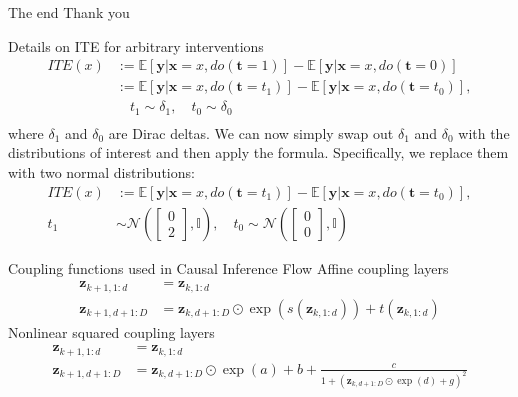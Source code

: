 \documentclass[dvipsnames, aspectratio=169]{beamer}
\newcommand{\E}{\mathbb{E}}
\newcommand{\eye}{\mathbb{I}}
\newcommand{\Norm}{\mathcal{N}}
\newcommand{\bt}{\mathbf{t}}
\newcommand{\bx}{\mathbf{x}}
\newcommand{\by}{\mathbf{y}}
\newcommand{\bz}{\mathbf{z}}
\begin{document}
	
	\begin{frame}{The end}
	    Thank you
	\end{frame}
	
	\begin{frame}{Details on ITE for arbitrary interventions}
	\begin{equation}
        \begin{split}
        ITE(x) &:= \E[\by | \bx=x, do(\bt=1)] - \E[\by | \bx=x, do(\bt=0)]\\
        &:= \E[\by | \bx=x, do(\bt=t_1)] - \E[\by | \bx=x, do(\bt=t_0)],\\
        &\quad t_1 \sim \delta_1, \quad t_0 \sim \delta_0\\
        \end{split}
    \end{equation}
    where $\delta_1$ and $\delta_0$ are Dirac deltas. We can now simply swap out $\delta_1$ and $\delta_0$ with the distributions of interest and then apply the formula. Specifically, we replace them with two normal distributions:
    \begin{equation}
        \begin{split}
        ITE(x) &:= \E[\by | \bx=x, do(\bt=t_1)] - \E[\by | \bx=x, do(\bt=t_0)], \\
        t_1 &\sim \Norm\left(\begin{bmatrix}0 \\ 2\end{bmatrix}, \eye\right), \quad t_0 \sim \Norm\left(\begin{bmatrix}0 \\ 0\end{bmatrix}, \eye\right)
        \end{split}
    \end{equation}
\end{frame}

    \begin{frame}{Coupling functions used in Causal Inference Flow}
        Affine coupling layers
        \begin{align}\label{equation:real_nvp_coupling}
            \bz_{k+1, 1:d} &= \bz_{k, 1:d} \\
            \bz_{k+1, d+1:D} &= \bz_{k, d+1:D} \odot \exp \left(s(\bz_{k, 1:d}) \right) + t(\bz_{k, 1:d})
        \end{align}
        Nonlinear squared coupling layers
        \begin{align}\label{equation:nonlinear_squared_flow}
            \bz_{k+1, 1:d} &= \bz_{k, 1:d} \\
            \bz_{k+1, d+1:D} &= \bz_{k, d+1:D} \odot \exp (a)  + b + \frac{c}{1 + (\bz_{k, d+1:D} \odot \exp (d) + g)^2}
        \end{align}
    \end{frame}
	    
\end{document}
